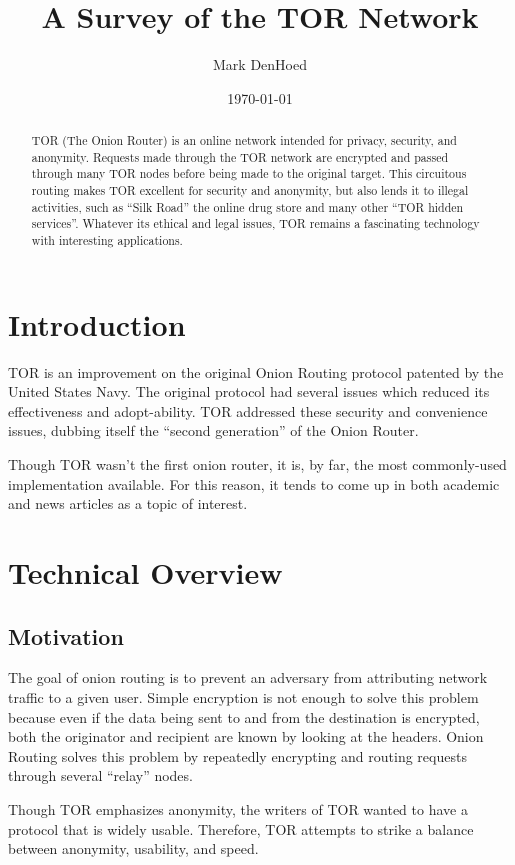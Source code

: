 \documentclass[letterpaper, titlepage, 12pt]{article}
\author{Mark DenHoed}
\title{A Survey of the TOR Network}
\date{\today}
\begin{document}
\maketitle
\begin{abstract}
TOR (The Onion Router) is an online network intended for privacy, security, and anonymity.  Requests made through the TOR network are encrypted and passed through many TOR nodes before being made to the original target. \cite{hi} This circuitous routing makes TOR excellent for security and anonymity, but also lends it to illegal activities, such as ``Silk Road'' \cite{silk} the online drug store and many other ``TOR hidden services''. Whatever its ethical and legal issues, TOR remains a fascinating technology with interesting applications.
\end{abstract}
\newpage
\tableofcontents
\newpage
\section{Introduction}
TOR is an improvement on the original Onion Routing protocol patented by the United States Navy. The original protocol had several issues which reduced its effectiveness and adopt-ability. TOR addressed these security and convenience issues, dubbing itself the ``second generation'' of the Onion Router\cite{whitepaper}.

Though TOR wasn't the first onion router, it is, by far, the most commonly-used implementation available. For this reason, it tends to come up in both academic and news articles as a topic of interest.
\section{Technical Overview}
\subsection{Motivation}
The goal of onion routing is to prevent an adversary from attributing network traffic to a given user. Simple encryption is not enough to solve this problem because even if the data being sent to and from the destination is encrypted, both the originator and recipient are known by looking at the headers. Onion Routing solves this problem by repeatedly encrypting and routing requests through several ``relay'' nodes.

Though TOR emphasizes anonymity, the writers of TOR wanted to have a protocol that is widely usable. Therefore, TOR attempts to strike a balance between anonymity, usability, and speed.
\end{document}
